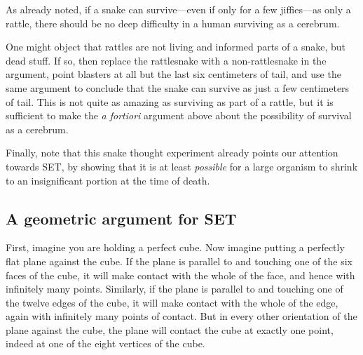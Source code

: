 As already noted, if a snake can survive---even if only for a few jiffies---as only a rattle, there should be no deep 
difficulty in a human surviving as a cerebrum. 

One might object that rattles are not living and informed parts of a snake, but dead stuff. If so, then replace the 
rattlesnake with a non-rattlesnake in the argument, point blasters at all but the last six centimeters of tail, and 
use the same argument to conclude that the snake can survive as just a few centimeters of tail. This is not quite as 
amazing as surviving as part of a rattle, but it is sufficient to make the \textit{a fortiori} argument above about the 
possibility of survival as a cerebrum.

Finally, note that this snake thought experiment already points our attention towards SET, by showing that it is 
at least \textit{possible} for a large organism to shrink to an insignificant portion at the time of death.  

\subsection{A geometric argument for SET}
First, imagine you are holding a perfect cube. Now imagine putting a perfectly flat plane against the cube. If the 
plane is parallel to and touching one of the six faces of the cube, it will make contact with the whole of the face, 
and hence with infinitely many points. Similarly, if the plane is parallel to and touching one of the twelve edges 
of the cube, it will make contact with the whole of the edge, again with infinitely many points of contact. But in 
every other orientation of the plane against the cube, the plane will contact the cube at exactly one point, indeed at 
one of the eight vertices of the cube. 

